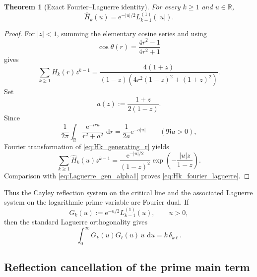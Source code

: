 \documentclass[11pt]{amsart}
\numberwithin{equation}{section}
\theoremstyle{plain}
\newtheorem{theorem}{Theorem}[section]
\theoremstyle{definition}
\theoremstyle{remark}
\newcommand{\e}{\mathrm e}
\newcommand{\dd}{\,\mathrm d}
\begin{document}
\begin{theorem}[Exact Fourier--Laguerre identity]
\label{thm:fourier_laguerre_identity}
For every $k\ge1$ and $u\in\mathbb R$,
\begin{equation}
 \boxed{
 \widehat H_k(u)
 =\e^{-|u|/2}L_{k-1}^{(1)}(|u|).}
 \label{eq:Hk_fourier_laguerre}
\end{equation}
\end{theorem}

\begin{proof}
For $|z|<1$, summing the elementary cosine series and using
\begin{equation}
 \cos\theta(r)=\frac{4r^2-1}{4r^2+1}
\end{equation}
gives
\begin{equation}
 \sum_{k\ge1}H_k(r)z^{k-1}
 =\frac{4(1+z)}{(1-z)\left(4r^2(1-z)^2+(1+z)^2\right)}.
 \label{eq:Hk_generating_r}
\end{equation}
Set
\begin{equation}
 a(z):=\frac{1+z}{2(1-z)}.
\end{equation}
Since
\begin{equation}
 \frac{1}{2\pi}\int_{\mathbb R}
 \frac{\e^{-iru}}{r^2+a^2}\,\dd r
 =\frac{1}{2a}\e^{-a|u|}
 \qquad(\Re a>0),
\end{equation}
Fourier transformation of \eqref{eq:Hk_generating_r} yields
\begin{equation}
 \sum_{k\ge1}\widehat H_k(u)z^{k-1}
 =\frac{\e^{-|u|/2}}{(1-z)^2}
 \exp\!\left(-\frac{|u|z}{1-z}\right).
 \label{eq:Hk_fourier_generating}
\end{equation}
Comparison with \eqref{eq:Laguerre_gen_alpha1} proves \eqref{eq:Hk_fourier_laguerre}.
\end{proof}

Thus the Cayley reflection system on the critical line and the associated Laguerre system on the logarithmic prime variable are Fourier dual.  If
\begin{equation}
 G_k(u):=\e^{-u/2}L_{k-1}^{(1)}(u),
 \qquad u>0,
 \label{eq:Laguerre_function_Gk}
\end{equation}
then the standard Laguerre orthogonality gives
\begin{equation}
 \int_0^\infty G_k(u)G_\ell(u)\,u\,\dd u
 =k\,\delta_{k\ell}.
 \label{eq:Laguerre_function_orthogonality}
\end{equation}

\subsection{Reflection cancellation of the prime main term}
\end{document}
